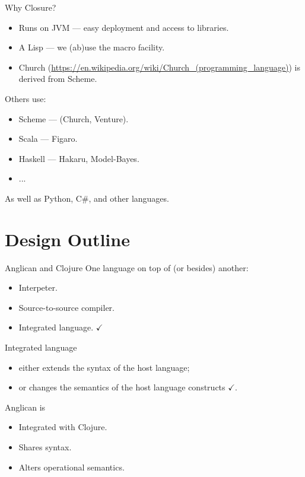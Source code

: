 \documentclass{beamer}
\begin{document}
\begin{frame}{Why Closure?}
\begin{itemize}
    \item Runs on JVM --- easy deployment and access to libraries.
        \pause
    \item A Lisp --- we (ab)use the macro facility.
        \pause
    \item Church (\url{https://en.wikipedia.org/wiki/Church_(programming_language)}) is derived from Scheme.
\end{itemize}
\pause
Others use:
    \begin{itemize}
        \item Scheme --- (Church, Venture).
        \item Scala --- Figaro.
        \item Haskell --- Hakaru, Model-Bayes.
        \item ...
    \end{itemize}
    \pause
    As well as Python, C\#,  and other languages.
\end{frame}

\section{Design Outline}

\begin{frame}{Anglican and Clojure}
    One language on top of (or besides) another:
    \begin{itemize}
        \item Interpeter.
        \item Source-to-source compiler.
        \item Integrated language. $\checkmark$
    \end{itemize}
    \pause
    \bigskip
    Integrated language
    \begin{itemize}
        \item either extends the syntax of the host language;
        \item or changes the semantics of the host language
            constructs $\checkmark$.
    \end{itemize}
    \pause
    \bigskip
    Anglican is 
    \begin{itemize}
        \item Integrated with Clojure.
        \item Shares syntax.
        \item Alters operational semantics.
    \end{itemize}
\end{frame}
\end{document}
